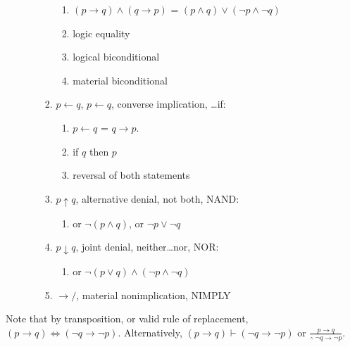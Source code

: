 \begin{enumerate}
\begin{enumerate}
\begin{enumerate}
			\begin{enumerate} \itemsep -1pt
			\item $(p \rightarrow q) \land (q \rightarrow p)$ = $(p \land q) \lor (\neg p \land \neg q)$
			\item logic equality
			\item logical biconditional
			\item material biconditional
			\end{enumerate}
		\item $p \leftarrow q$, $p \longleftarrow q$, converse implication, \dots if: \vspace{-0.1cm}
			\begin{enumerate} \itemsep -1pt
			\item $p \leftarrow q$ = $q \rightarrow p$.
			\item if $q$ then $p$
			\item reversal of both statements
			\end{enumerate}
		\item $p \uparrow q$, alternative denial, not both, NAND: \vspace{-0.1cm}
			\begin{enumerate} \itemsep -1pt
			\item or $\neg (p \land q)$, or $\neg p \lor \neg q$
			\end{enumerate}
		\item $p \downarrow q$, joint denial, neither\dots nor, NOR: \vspace{-0.1cm}
			\begin{enumerate} \itemsep -1pt
			\item or $\neg (p \lor q) \land (\neg p \land \neg q)$
			\end{enumerate}
		\item $\rightarrow/$, material nonimplication, NIMPLY
		\end{enumerate}
	\end{enumerate}
\end{enumerate}

Note that by transposition, or valid rule of replacement, $(p \rightarrow q) \Longleftrightarrow (\neg q \rightarrow \neg p)$. Alternatively, $(p \rightarrow q) \vdash (\neg q \rightarrow \neg p)$ or $\frac{p \rightarrow q}{\therefore\ \neg q \rightarrow \neg p}$.



